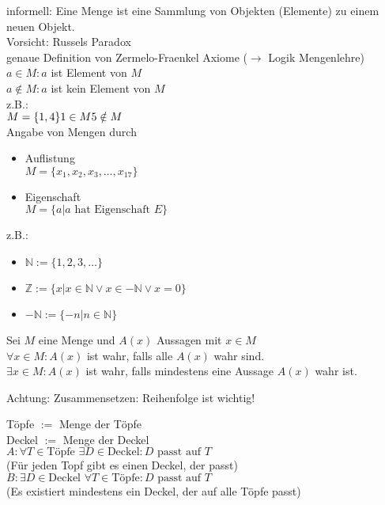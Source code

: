 \documentclass[../ana1.tex]{subfiles}
\begin{document}
informell: Eine Menge ist eine Sammlung von Objekten (Elemente) zu einem neuen Objekt.\\
Vorsicht: Russels Paradox\\
genaue Definition von Zermelo-Fraenkel Axiome ($\rightarrow$ Logik Mengenlehre)\\
$a\in M: a$ ist Element von $M$\\
$a \notin M: a$ ist kein Element von $M$\\
z.B.:\\
$M = \{1, 4\}\\1\in M\\5 \notin M$\\
Angabe von Mengen durch
\begin{itemize}
	\item Auflistung\\
	      $M = \{x_1, x_2, x_3, \dots, x_{17} \}$
	\item Eigenschaft\\
	      $M = \{a | a \text{ hat Eigenschaft } E\}$
\end{itemize}
z.B.:
\begin{itemize}
	\item $\mathbb{N} := \{1,2,3,\dots\}$
	\item $\mathbb{Z} := \{x | x \in \mathbb{N} \vee x \in -\mathbb{N} \vee x = 0 \}$
	\item $-\mathbb{N} := \{-n|n\in\mathbb{N}\}$
\end{itemize}
\begin{defi}
	Sei $M$ eine Menge und $A(x)$ Aussagen mit $x\in M$\\
	$\forall x \in M: A(x)$ ist wahr, falls alle $A(x)$ wahr sind.\\
	$\exists x\in M:A(x)$ ist wahr, falls mindestens eine Aussage $A(x)$ wahr ist.
\end{defi}
Achtung: Zusammensetzen: Reihenfolge ist wichtig!
\begin{bsp}
	Töpfe $:=$ Menge der Töpfe\\
	Deckel $:=$ Menge der Deckel\\
	$A: \forall T \in \text{Töpfe } \exists D\in \text{Deckel}: D \text{ passt auf } T$\\(Für jeden Topf gibt es einen Deckel, der passt)\\
	$B: \exists D \in \text{Deckel } \forall T \in \text{Töpfe}: D \text{ passt auf } T$\\(Es existiert mindestens ein Deckel, der auf alle Töpfe passt)
\end{bsp}
\end{document}
